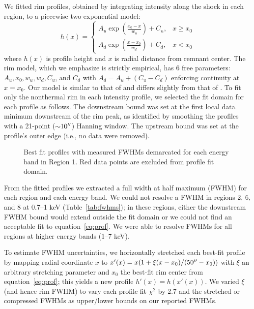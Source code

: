 \documentclass[iop, apj, numberedappendix, twocolappendix]{emulateapj}
\newcommand*{\abt}{\mathord{\sim}} %
\begin{document}
We fitted rim profiles, obtained by integrating intensity along the shock in
each region, to a piecewise two-exponential model:
\begin{equation} \label{eq:prof}
    h(x) =
    \begin{cases}
        A_u \exp \left(\frac{x_0 - x}{w_u}\right) + C_u, &x \geq x_0 \\
        A_d \exp \left(\frac{x - x_0}{w_d}\right) + C_d, &x < x_0
    \end{cases}
\end{equation}
where $h(x)$ is profile height and $x$ is radial distance from remnant center.
The rim model, which we emphasize is strictly empirical, has 6 free parameters:
$A_u, x_0, w_u, w_d, C_u$, and $C_d$ with $A_d = A_u + (C_u - C_d)$ enforcing
continuity at $x=x_0$. Our model is similar to that of \citet{bamba2003,
bamba2005-hist} and differs slightly from that of .
To fit only the nonthermal rim in each intensity profile, we selected the fit
domain for each profile as follows.  The downstream bound was set at the first
local data minimum downstream of the rim peak, as identified by smoothing the
profiles with a 21-point ($\abt 10\arcsec$) Hanning window.  The upstream bound
was set at the profile's outer edge (i.e., no data were removed).

\begin{figure*}[ht]
    \caption{Best fit profiles with measured FWHMs demarcated for each energy
             band in Region 1.  Red data points are excluded from profile fit
             domain.}
    \label{fig:profiles}
\end{figure*}

From the fitted profiles we extracted a full width at half maximum (FWHM) for
each region and each energy band.  We could not resolve a FWHM in regions 2, 6,
and 8 at 0.7--1 keV (Table~\ref{tab:fwhms}); in these regions, either
the downstream FWHM bound would extend outside the fit domain or we could not
find an acceptable fit to equation~\eqref{eq:prof}.  We were able to resolve
FWHMs for all regions at higher energy bands (1--7 keV).

To estimate FWHM uncertainties, we horizontally stretched each best-fit
profile by mapping radial coordinate $x$ to
$x'(x) = x (1 + \xi (x-x_0)/(50\mbox{$^{\prime\prime}$}-x_0))$ with $\xi$ an arbitrary stretching
parameter and $x_0$ the best-fit rim center from equation~\eqref{eq:prof};
this yields a new profile $h'(x) = h(x'(x))$.
We varied $\xi$ (and hence rim FWHM) to vary each profile fit $\chi^2$ by 2.7
and the stretched or compressed FWHMs as upper/lower bounds on our reported
FWHMs.
\end{document}
